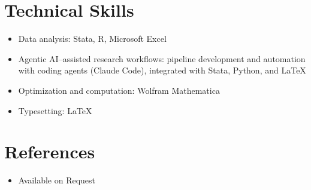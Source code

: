 \documentclass[letter,11pt]{article}
\newcommand{\dateright}[1]{\hfill{\small #1}}
\begin{document}
\section{Technical Skills}
\begin{itemize}
\item[] Data analysis: Stata, R, Microsoft Excel
\item[] Agentic AI--assisted research workflows: pipeline development and automation with coding agents (Claude Code), integrated with Stata, Python, and \LaTeX
\item[] Optimization and computation: Wolfram Mathematica
\item[] Typesetting: \LaTeX
\end{itemize}


\section{References}
\begin{itemize}
    \item[] Available on Request
\end{itemize}

\end{document}
